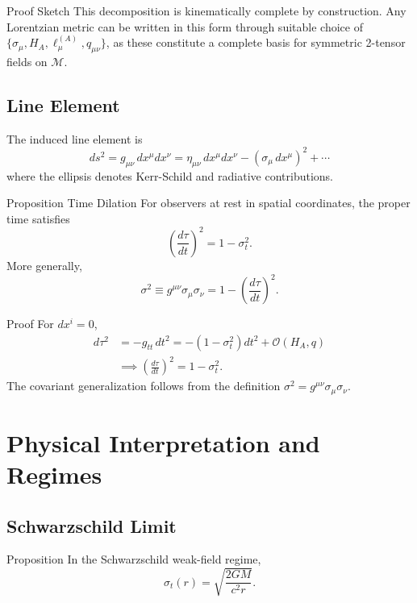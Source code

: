 \documentclass[11pt,a4paper]{article}
\theoremstyle{definition}
\theoremstyle{remark}
\begin{document}
	Proof Sketch
		This decomposition is kinematically complete by construction. Any Lorentzian metric can be written in this form through suitable choice of $\{\sigma_\mu, H_A, \ell_\mu^{(A)}, q_{\mu\nu}\}$, as these constitute a complete basis for symmetric 2-tensor fields on $\mathcal{M}$.
	
	\subsection{Line Element}
	
	The induced line element is
	\begin{equation}
		ds^2 = g_{\mu\nu} \, dx^\mu dx^\nu = \eta_{\mu\nu} \, dx^\mu dx^\nu - (\sigma_\mu \, dx^\mu)^2 + \cdots
	\end{equation}
	where the ellipsis denotes Kerr-Schild and radiative contributions.
	
	Proposition Time Dilation
		For observers at rest in spatial coordinates, the proper time satisfies
		\begin{equation}
			\left(\frac{d\tau}{dt}\right)^2 = 1 - \sigma_t^2.
		\end{equation}
		More generally,
		\begin{equation}
			\boxed{\sigma^2 \equiv g^{\mu\nu}\sigma_\mu\sigma_\nu = 1 - \left(\frac{d\tau}{dt}\right)^2.}
		\end{equation}
	
	Proof
		For $dx^i = 0$,
		\begin{align}
			d\tau^2 &= -g_{tt} \, dt^2 = -(1 - \sigma_t^2) dt^2 + \mathcal{O}(H_A, q)\\
			&\implies \left(\frac{d\tau}{dt}\right)^2 = 1 - \sigma_t^2.
		\end{align}
		The covariant generalization follows from the definition $\sigma^2 = g^{\mu\nu}\sigma_\mu\sigma_\nu$.
	
	\section{Physical Interpretation and Regimes}
	
	\subsection{Schwarzschild Limit}
	
	Proposition
		In the Schwarzschild weak-field regime,
		\begin{equation}
			\sigma_t(r) = \sqrt{\frac{2GM}{c^2 r}}.
		\end{equation}
	
\end{document}
